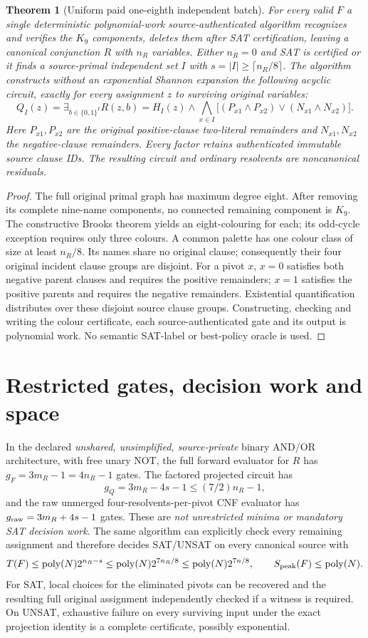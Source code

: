 \documentclass[11pt]{article}
\newtheorem{theorem}{Theorem}
\begin{document}
\begin{theorem}[Uniform paid one-eighth independent batch]
For every valid $F$ a single deterministic polynomial-work source-authenticated algorithm recognizes and verifies the $K_9$ components, deletes them after SAT certification, leaving a canonical conjunction $R$ with $n_R$ variables. Either $n_R=0$ and SAT is certified or it finds a source-primal independent set $I$ with $s=|I|\ge\lceil n_R/8\rceil$. The algorithm constructs without an exponential Shannon expansion the following acyclic circuit, exactly for every assignment $z$ to surviving original variables:
\[
Q_I(z)=\exists_{b\in\{0,1\}^{I}}R(z,b)
 =H_I(z)\land\bigwedge_{x\in I}\big[
 (P_{x1}\land P_{x2})\lor(N_{x1}\land N_{x2})\big].
\]
Here $P_{x1},P_{x2}$ are the original positive-clause two-literal remainders and $N_{x1},N_{x2}$ the negative-clause remainders. Every factor retains authenticated immutable source clause IDs. The resulting circuit and ordinary resolvents are noncanonical residuals.
\end{theorem}
\begin{proof}
The full original primal graph has maximum degree eight. After removing its complete nine-name components, no connected remaining component is $K_9$. The constructive Brooks theorem yields an eight-colouring for each; its odd-cycle exception requires only three colours. A common palette has one colour class of size at least $n_R/8$. Its names share no original clause; consequently their four original incident clause groups are disjoint. For a pivot $x$, $x=0$ satisfies both negative parent clauses and requires the positive remainders; $x=1$ satisfies the positive parents and requires the negative remainders. Existential quantification distributes over these disjoint source clause groups. Constructing, checking and writing the colour certificate, each source-authenticated gate and its output is polynomial work. No semantic SAT-label or best-policy oracle is used.
\end{proof}

\section{Restricted gates, decision work and space}
In the declared \emph{unshared, unsimplified, source-private} binary AND/OR architecture, with free unary NOT, the full forward evaluator for $R$ has $g_F=3m_R-1=4n_R-1$ gates. The factored projected circuit has
\[
g_Q=3m_R-4s-1\le(7/2)n_R-1,
\]
and the raw unmerged four-resolvents-per-pivot CNF evaluator has $g_{\rm raw}=3m_R+4s-1$ gates. These are \emph{not unrestricted minima or mandatory SAT decision work}. The same algorithm can explicitly check every remaining assignment and therefore decides SAT/UNSAT on every canonical source with
\[
T(F)\le\operatorname{poly}(N)2^{n_R-s}
 \le\operatorname{poly}(N)2^{7n_R/8}
 \le\operatorname{poly}(N)2^{7n/8},
\qquad S_{\rm peak}(F)\le\operatorname{poly}(N).
\]
For SAT, local choices for the eliminated pivots can be recovered and the resulting full original assignment independently checked if a witness is required. On UNSAT, exhaustive failure on every surviving input under the exact projection identity is a complete certificate, possibly exponential.
\end{document}
